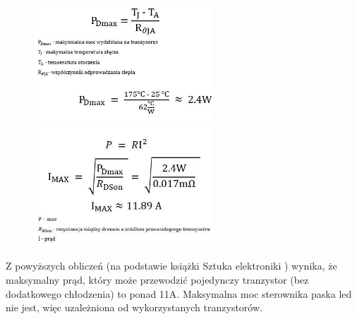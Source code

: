 \documentclass[12pt, eng, twoside, openany, final]{mgr}
\begin{document}
                \begin{figure}[H]
                \begin{center}
                    \includegraphics[width=0.6\textwidth]{obliczenia1.jpg}
                    \includegraphics[width=0.6\textwidth]{obliczenia2.jpg}
                \end{center}
                \end{figure}
                \indent Z powyższych obliczeń (na podstawie książki Sztuka elektroniki\cite{sztuka} ) wynika, że maksymalny prąd, który może przewodzić pojedynczy tranzystor (bez dodatkowego chłodzenia) to ponad 11A. Maksymalna moc sterownika paska led nie jest, więc uzależniona od wykorzystanych tranzystorów.  
                
            
\end{document}
